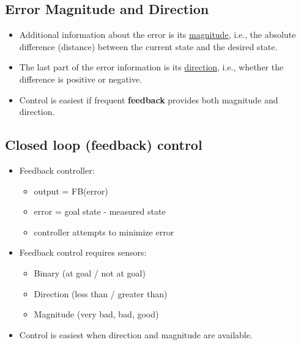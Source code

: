\documentclass[10pt]{article}
\begin{document}
\subsection*{Error Magnitude and Direction}
\begin{itemize}
	\item Additional information about the error is its \underline{magnitude}, i.e., the absolute difference (distance) between the current state and the desired state.
	\item The last part of the error information is its \underline{direction}, i.e., whether the difference is positive or negative.
	\item Control is easiest if frequent \textbf{feedback} provides both magnitude and direction.
\end{itemize}

\subsection*{Closed loop (feedback) control}
\begin{itemize}
	\item Feedback controller:
	\begin{itemize}
        \item output = FB(error)
        \item error = goal state - measured state
        \item controller attempts to minimize error
    \end{itemize}
	\item Feedback control requires sensors:
	\begin{itemize}
        \item Binary (at goal / not at goal)
        \item Direction (less than / greater than)
        \item Magnitude (very bad, bad, good)
    \end{itemize}
    \item Control is easiest when direction and magnitude are available.
\end{itemize}
\end{document}
